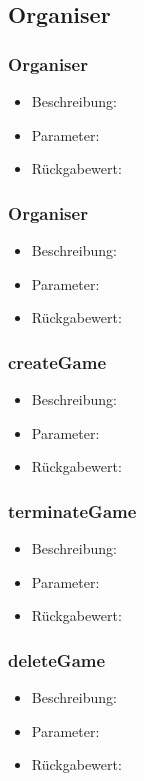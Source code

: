 \documentclass[a4paper]{scrreprt}
\begin{document}
	\subsection{Organiser}
		\subsubsection{Organiser}
		\begin{itemize}
			\item Beschreibung:
			\item Parameter:
			\item Rückgabewert:
		\end{itemize}
		\subsubsection{Organiser}
		\begin{itemize}
			\item Beschreibung:
			\item Parameter:
			\item Rückgabewert:
		\end{itemize}
		\subsubsection{createGame}
		\begin{itemize}
			\item Beschreibung:
			\item Parameter:
			\item Rückgabewert:
		\end{itemize}
		\subsubsection{terminateGame}
		\begin{itemize}
			\item Beschreibung:
			\item Parameter:
			\item Rückgabewert:
		\end{itemize}
		\subsubsection{deleteGame}
		\begin{itemize}
			\item Beschreibung:
			\item Parameter:
			\item Rückgabewert:
		\end{itemize}
\end{document}
